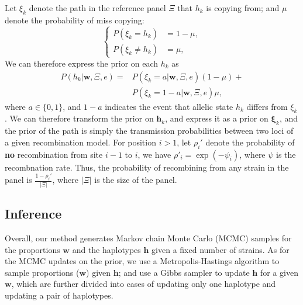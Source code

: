 \documentclass{bioinfo}
\begin{document}
\begin{itemize}
Let $\xi_k$ denote the path in the reference panel $\Xi$ that $h_k$ is copying from; and $\mu$ denote the probability of miss copying:
$$\begin{cases}
P(\xi_k = h_k) &= 1-\mu, \\
P(\xi_k \neq h_k) &= \mu,\end{cases}$$
We can therefore express the prior on each $h_k$ as
\begin{equation}
\begin{split}
P (h_k|\mathbf{w}, \Xi, e) = & P (\xi_k = a|\mathbf{w}, \Xi, e) (1-\mu) +\\
                             & P (\xi_k = 1-a|\mathbf{w}, \Xi, e) \mu,
\end{split}\label{eqn:prior_on_h}
\end{equation}
where $a \in \{0, 1\}$, and $1-a$ indicates the event that allelic state $h_k$ differs from $\xi_k$. We can therefore transform the prior on $\mathbf{h}_k$, and express it as a prior on $\mathbf{\xi}_k$, and the prior of the path is simply the transmission probabilities between two loci of a given recombination model. For position $i > 1$, let $\rho_i'$ denote the probability of {\bf no} recombination from site $i-1$ to $i$, we have $\rho'_i = \exp(-\psi_i)$, where $\psi$ is the recombnation rate. Thus, the probability of recombining from any strain in the panel is $\displaystyle\frac{1-\rho_i'}{|\Xi|}$, where $|\Xi|$ is the size of the panel.

\end{itemize}





\subsection{Inference}

Overall, our method generates Markov chain Monte Carlo (MCMC) samples for the proportions $\mathbf w$ and the haplotypes $\mathbf h$ given a fixed number of strains. As for the MCMC updates on the prior, we use a Metropolis-Hastings algorithm to sample proportions ($\mathbf w$) given $\mathbf h$; and use a Gibbs sampler to update $\mathbf h$ for a given $\mathbf w$, which are further divided into cases of updating only one haplotype and updating a pair of haplotypes.
\end{document}
